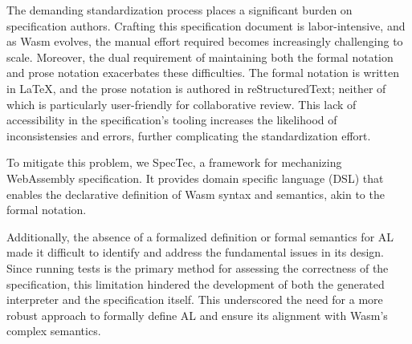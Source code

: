 The demanding standardization process places a significant burden on
specification authors.
Crafting this specification document is labor-intensive, and as Wasm evolves,
the manual effort required becomes increasingly challenging to scale.
Moreover, the dual requirement of maintaining both the formal notation and
prose notation exacerbates these difficulties.
The formal notation is written in LaTeX, and the prose notation is authored
in reStructuredText; neither of which is particularly user-friendly for
collaborative review.
This lack of accessibility in the specification's tooling increases the
likelihood of inconsistensies and errors, further complicating the
standardization effort.


To mitigate this problem, we  SpecTec, a framework for mechanizing
WebAssembly specification.
It provides domain specific language (DSL) that enables the declarative
definition of Wasm syntax and semantics, akin to the formal notation.


Additionally, the absence of a formalized definition or formal semantics for AL
made it difficult to identify and address the fundamental issues in its design.
Since running tests is the primary method for assessing the correctness of the
specification, this limitation hindered the development of both the generated
interpreter and the specification itself.
This underscored the need for a more robust approach to formally define AL and
ensure its alignment with Wasm's complex semantics.


